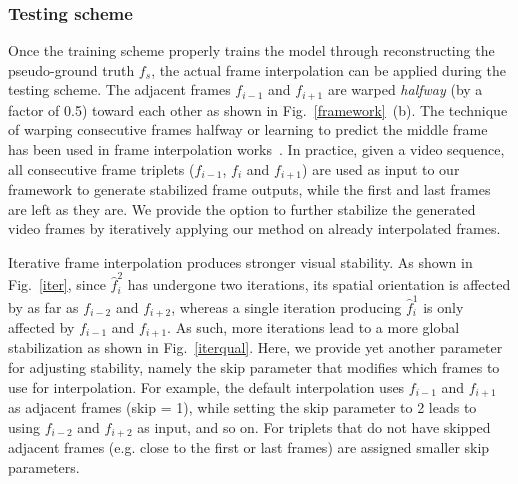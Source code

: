 \subsubsection{\textbf{Testing scheme}}
Once the training scheme properly trains the model through reconstructing the pseudo-ground truth $f_s$, the actual frame interpolation can be applied during the testing scheme.
The adjacent frames $f_{i-1}$ and $f_{i+1}$ are warped \emph{halfway} (by a factor of 0.5) toward each other as shown in Fig.~\ref{framework}~(b).
The technique of warping consecutive frames halfway or learning to predict the middle frame has been used in frame interpolation works~\cite{niklaus2018context,niklaus2017video,niklaus2017adaptive,meyer2015phase}.
In practice, given a video sequence, all consecutive frame triplets ($f_{i-1}$, $f_i$ and $f_{i+1}$) are used as input to our framework to generate stabilized frame outputs, while the first and last frames are left as they are.
We provide the option to further stabilize the generated video frames by iteratively applying our method on already interpolated frames.

Iterative frame interpolation produces stronger visual stability.
As shown in Fig.~\ref{iter}, since $\hat{f}^2_i$ has undergone two iterations, its spatial orientation is affected by as far as $f_{i-2}$ and $f_{i+2}$, whereas a single iteration producing $\hat{f}^1_i$ is only affected by $f_{i-1}$ and $f_{i+1}$.
As such, more iterations lead to a more global stabilization as shown in Fig.~\ref{iterqual}.
Here, we provide yet another parameter for adjusting stability, namely the skip parameter that modifies which frames to use for interpolation.
For example, the default interpolation uses $f_{i-1}$ and $f_{i+1}$ as adjacent frames (skip = 1), while setting the skip parameter to 2 leads to using $f_{i-2}$ and $f_{i+2}$ as input, and so on.
For triplets that do not have skipped adjacent frames (e.g. close to the first or last frames) are assigned smaller skip parameters.

